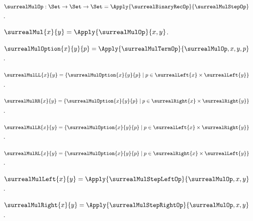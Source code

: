 \begin{definition}\label{surreal_mul_typed}
    $\surrealMulOp:\Set\to\Set\to\Set
        =\Apply{\surrealBinaryRecOp}{\surrealMulStepOp}$.
\end{definition}

\begin{definition}\label{surreal_mul}
    $\surrealMul{x}{y}=\Apply{\surrealMulOp}{x,y}$.
\end{definition}

\begin{definition}\label{surreal_mul_option}
    $\surrealMulOption{x}{y}{p}=
        \Apply{\surrealMulTermOp}{\surrealMulOp,x,y,p}$.
\end{definition}

\begin{definition}\label{surreal_mul_ll}
    $\surrealMulLL{x}{y}=
        \{\surrealMulOption{x}{y}{p}\mid
            p\in\surrealLeft{x}\times\surrealLeft{y}\}$.
\end{definition}

\begin{definition}\label{surreal_mul_rr}
    $\surrealMulRR{x}{y}=
        \{\surrealMulOption{x}{y}{p}\mid
            p\in\surrealRight{x}\times\surrealRight{y}\}$.
\end{definition}

\begin{definition}\label{surreal_mul_lr}
    $\surrealMulLR{x}{y}=
        \{\surrealMulOption{x}{y}{p}\mid
            p\in\surrealLeft{x}\times\surrealRight{y}\}$.
\end{definition}

\begin{definition}\label{surreal_mul_rl}
    $\surrealMulRL{x}{y}=
        \{\surrealMulOption{x}{y}{p}\mid
            p\in\surrealRight{x}\times\surrealLeft{y}\}$.
\end{definition}

\begin{definition}\label{surreal_mul_left}
    $\surrealMulLeft{x}{y}=
        \Apply{\surrealMulStepLeftOp}{\surrealMulOp,x,y}$.
\end{definition}

\begin{definition}\label{surreal_mul_right}
    $\surrealMulRight{x}{y}=
        \Apply{\surrealMulStepRightOp}{\surrealMulOp,x,y}$.
\end{definition}

